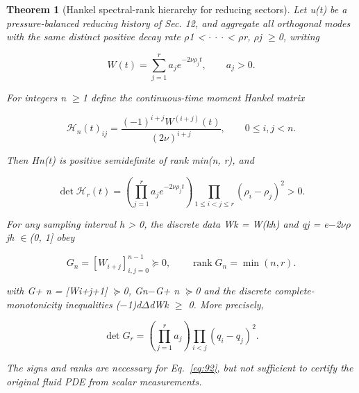 \documentclass[10pt,letterpaper]{article}
\newtheorem{theorem}{Theorem}[section]
\theoremstyle{remark}
\begin{document}
\begin{theorem}[Hankel spectral-rank hierarchy for reducing sectors]

Let u(t) be a pressure-balanced reducing history of Sec. 12, and aggregate all orthogonal modes with the same distinct positive decay rate \(\rho \)1 < \(\cdot \) \(\cdot \) \(\cdot \) < \(\rho \)r, \(\rho \)j \(\ge \)0, writing


\begin{equation}
\tag{92}\label{eq:92}
W(t)=\sum_{j=1}^r a_je^{-2\nu\rho_jt},\qquad a_j>0.
\end{equation}

For integers n \(\ge \)1 define the continuous-time moment Hankel matrix



\begin{equation}
\tag{93}\label{eq:93}
\mathcal H_n(t)_{ij}=\frac{(-1)^{i+j}W^{(i+j)}(t)}{(2\nu)^{i+j}},\qquad0\le i,j<n.
\end{equation}

Then Hn(t) is positive semidefinite of rank min(n, r), and



\begin{equation}
\tag{94}\label{eq:94}
\det\mathcal H_r(t)=\left(\prod_{j=1}^ra_je^{-2\nu\rho_jt}\right)\prod_{1\le i<j\le r}(\rho_i-\rho_j)^2>0.
\end{equation}

For any sampling interval h > 0, the discrete data Wk = W(kh) and qj = e\(- \)2\(\nu \rho \)jh \(\in \)(0, 1] obey



\begin{equation}
\tag{95}\label{eq:95}
G_n=[W_{i+j}]_{i,j=0}^{n-1}\succeq0,\qquad\operatorname{rank}G_n=\min(n,r).
\end{equation}

with G+ n = [Wi+j+1] \(\succeq \)0, Gn\(- \)G+ n \(\succeq \)0 and the discrete complete-monotonicity inequalities (\(- \)1)d\(\Delta \)dWk \(\ge \) 0. More precisely,



\begin{equation}
\tag{96}\label{eq:96}
\det G_r=\left(\prod_{j=1}^ra_j\right)\prod_{i<j}(q_i-q_j)^2.
\end{equation}

The signs and ranks are necessary for Eq.~\eqref{eq:92}, but not sufficient to certify the original fluid PDE from scalar measurements.


\end{theorem}
\end{document}
